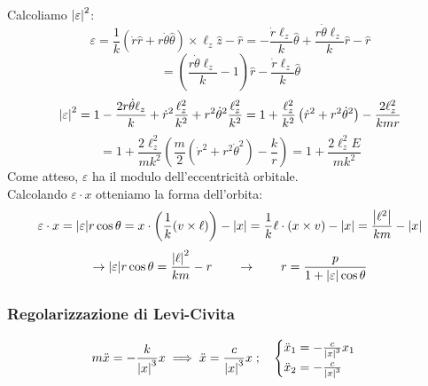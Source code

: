 Calcoliamo $\abs{\varepsilon}^2$:
\begin{equation*}
    \varepsilon = \frac{1}{k} \left( \dot{r} \hat{r} + r \dot{\theta} \hat{\theta} \right) \times \ell_z \hat{z} - \hat{r} 
    = - \frac{\dot{r} \ell_z}{k} \hat{\theta} + \frac{r \dot{\theta} \ell_z}{k} \hat{r} - \hat{r}
\end{equation*}
\begin{equation*}
    = \left( \frac{r \dot{\theta} \ell_z}{k} - 1 \right) \hat{r} - \frac{\dot{r} \ell_z}{k} \hat{\theta}
\end{equation*}
\begin{equation*}
    \abs{\varepsilon}^2 = 1 - \frac{2r \dot{\theta} \ell_z }{k} + \dot{r}^2 \frac{\ell_z^2}{k^2} + r^2 \dot{\theta}^2 \frac{\ell_z^2}{k^2}
    = 1 + \frac{\ell_z^2}{k^2} \left( \dot{r}^2 + r^2 \dot{\theta}^2 \right) - \frac{2\ell_z^2}{k m r}
\end{equation*}
\begin{equation}
    = 1 + \frac{2\ell_z^2}{m k^2} \left( \frac{m}{2} \left( \dot{r}^2 + r^2 \dot{\theta}^2 \right) - \frac{k}{r} \right)
    = 1 + \frac{2\ell_z^2 E}{m k^2}
\end{equation}
Come atteso, $\varepsilon$ ha il modulo dell'eccentricità orbitale.\\
Calcolando $\varepsilon\cdot x$ otteniamo la forma dell'orbita:
\begin{equation*}
    \varepsilon \cdot x = \abs{\varepsilon} r \cos\theta = x \cdot \left( \frac{1}{k} (v \times \ell) \right) - \abs{x} 
    = \frac{1}{k}\ell\cdot\left( x\times v \right)-\abs{x}= \frac{\abs{\ell^2}}{km}-\abs{x}
\end{equation*}
\begin{equation*}
    \rightarrow \abs{\varepsilon} r \cos\theta = \frac{\abs{\ell}^2}{km} - r 
    \qquad \rightarrow \qquad r = \frac{p}{1 + \abs{\varepsilon} \cos\theta}
\end{equation*}






\subsubsection{Regolarizzazione di Levi-Civita}
\begin{equation}
    m\ddot{x}= -\frac{k}{\abs{x}^3}x \implies \ddot{x}= \frac{c}{\abs{x}^3}x \;;\quad
    \begin{cases}
        \ddot{x}_1=-\frac{c}{\abs{x}^3}x_1\\
        \ddot{x}_2=-\frac{c}{\abs{x}^3}
    \end{cases}
\end{equation}

